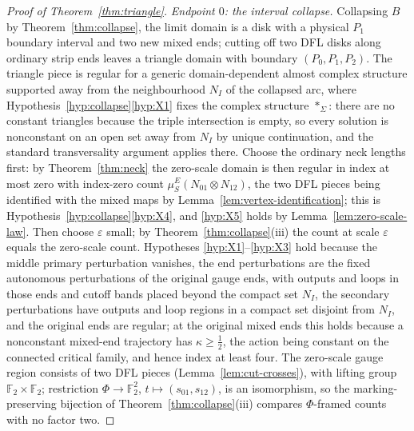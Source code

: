 \documentclass[11pt]{amsart}
\theoremstyle{definition}
\theoremstyle{remark}
\theoremstyle{plain}
\numberwithin{equation}{section}
\newcommand{\FF}{\mathbb{F}_2}
\newcommand{\eps}{\varepsilon}
\begin{document}
\begin{proof}[Proof of Theorem~\ref{thm:triangle}]
\emph{Endpoint $0$: the interval collapse.} Collapsing $B$ by
Theorem~\ref{thm:collapse}, the limit domain is a disk with a physical
$P_1$ boundary interval and two new mixed ends; cutting off two DFL disks
along ordinary strip ends leaves a triangle domain with boundary
$(P_0,P_1,P_2)$. The triangle piece is regular for a generic domain-dependent
almost complex structure supported away from the neighbourhood $N_I$ of the
collapsed arc, where Hypothesis~\ref{hyp:collapse}\ref{hyp:X1} fixes the complex
structure $*_\Sigma$: there are no constant triangles because the triple intersection is
empty, so every solution is nonconstant on an open set away from $N_I$ by unique
continuation, and the standard transversality argument applies there.
Choose the ordinary neck lengths first: by
Theorem~\ref{thm:neck} the zero-scale domain is then regular in index at
most zero with index-zero count $\mu_S^E(N_{01}\otimes N_{12})$, the two DFL
pieces being identified with the mixed maps by
Lemma~\ref{lem:vertex-identification}; this is
Hypothesis~\ref{hyp:collapse}\ref{hyp:X4}, and \ref{hyp:X5} holds by
Lemma~\ref{lem:zero-scale-law}. Then choose $\eps$ small; by
Theorem~\ref{thm:collapse}(iii) the count at scale $\eps$ equals the
zero-scale count. Hypotheses \ref{hyp:X1}--\ref{hyp:X3} hold because the
middle primary perturbation vanishes, the end perturbations are the fixed autonomous
perturbations of the original gauge ends, with outputs and loops in those ends and cutoff bands
placed beyond the compact set $N_I$, the secondary perturbations have outputs and loop regions in a compact set
disjoint from $N_I$, and the original ends are regular; at the original
mixed ends this holds because a nonconstant mixed-end trajectory has
$\kappa\ge\frac12$, the action being constant on the connected critical family,
and hence index at least four. The zero-scale gauge region consists of two DFL
pieces (Lemma~\ref{lem:cut-crosses}), with lifting group $\FF\times\FF$; restriction
$\Phi\to\FF^2$, $t\mapsto(s_{01},s_{12})$, is an isomorphism, so the
marking-preserving bijection of Theorem~\ref{thm:collapse}(iii) compares
$\Phi$-framed counts with no factor two.


\end{proof}
\end{document}
